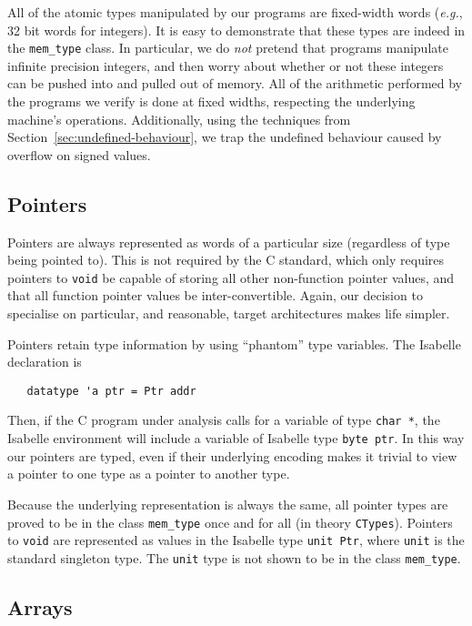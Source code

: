 \documentclass{article}
\newcommand{\eg}{\textit{e.g.}}
\begin{document}
All of the atomic types manipulated by our programs are fixed-width
words (\eg, 32 bit words for integers).  It is easy to demonstrate
that these types are indeed in the \texttt{mem_type} class.  In
particular, we do \emph{not} pretend that programs manipulate infinite
precision integers, and then worry about whether or not these integers
can be pushed into and pulled out of memory.  All of the arithmetic
performed by the programs we verify is done at fixed widths,
respecting the underlying machine's operations.
Additionally, using the techniques from Section~\ref{sec:undefined-behaviour},
we trap the undefined behaviour caused by overflow on signed values.

\subsection{Pointers}
\label{sec:pointers}

Pointers are always represented as words of a particular size
(regardless of type being pointed to).  This is not required by the C
standard, which only requires pointers to \texttt{void} be capable of
storing all other non-function pointer values, and that all function
pointer values be inter-convertible.  Again, our decision to
specialise on particular, and reasonable, target architectures makes
life simpler.

Pointers retain type information by using ``phantom'' type variables.
The Isabelle declaration is
\begin{verbatim}
   datatype 'a ptr = Ptr addr
\end{verbatim}
Then, if the C program under analysis calls for a variable of type
\texttt{char~*}, the Isabelle environment will include a variable of
Isabelle type \texttt{byte~ptr}.  In this way our pointers are typed,
even if their underlying encoding makes it trivial to view a pointer
to one type as a pointer to another type.

Because the underlying representation is always the same, all pointer
types are proved to be in the class \texttt{mem_type} once and for
all (in theory \texttt{CTypes}).  Pointers to \texttt{void} are
represented as values in the Isabelle type \texttt{unit~Ptr}, where
\texttt{unit} is the standard singleton type.  The \texttt{unit} type
is not shown to be in the class \texttt{mem_type}.

\subsection{Arrays}
\label{sec:arrays}
\end{document}
